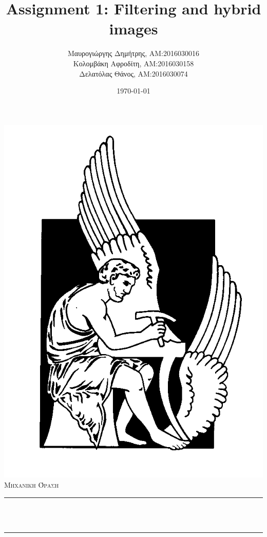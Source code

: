 \documentclass{article}
\newcommand{\tl}[1]{\textlatin{#1}}
\begin{document}
	\greektext
	\title{\tl{Assignment 1: Filtering and hybrid images}}						%
	\author{Μαυρογιώργης Δημήτρης, AM:2016030016\\Κολομβάκη Αφροδίτη, AM:2016030158\\Δελατόλας Θάνος, AM:2016030074}								%
	\date{\today}											%
	
	\makeatletter
	\let\thetitle\@title
	\let\theauthor\@author
	\let\thedate\@date
	\makeatother
	
	
	
	\begin{titlepage}
		\centering
		\vspace*{0.5 cm}
		\includegraphics[scale = 0.4]{polytexneio-logo.png}\\[1.0 cm]	%
		\textsc{\LARGE Μηχανικη Όραση }\\[2.0 cm]	
		\rule{\linewidth}{0.2 mm} \\[0.4 cm]
		{ \huge \bfseries \thetitle}\\
		\rule{\linewidth}{0.2 mm} \\[1.5 cm]
		

\end{titlepage}
\end{document}
